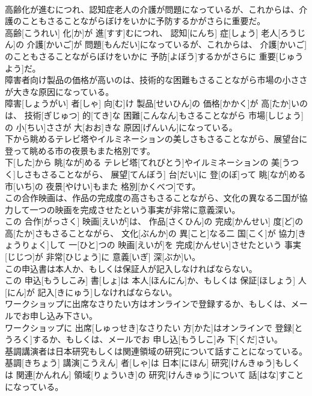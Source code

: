 \documentclass[8pt]{extreport}
\begin{document}
\begin{CJK}{UTF8}{min}
\\	高齢化が進むにつれ、認知症老人の介護が問題になっているが、これからは、介護のこともさることながらぼけをいかに予防するかがさらに重要だ。	
\\	高齢[こうれい] 化[か]が 進[すす]むにつれ、 認知[にんち] 症[しょう] 老人[ろうじん]の 介護[かいご]が 問題[もんだい]になっているが、これからは、 介護[かいご]のこともさることながらぼけをいかに 予防[よぼう]するかがさらに 重要[じゅうよう]だ。
\\	障害者向け製品の価格が高いのは、技術的な困難もさることながら市場の小ささが大きな原因になっている。	
\\	障害[しょうがい] 者[しゃ] 向[む]け 製品[せいひん]の 価格[かかく]が 高[たか]いのは、 技術[ぎじゅつ] 的[てき]な 困難[こんなん]もさることながら 市場[しじょう]の 小[ちい]ささが 大[おお]きな 原因[げんいん]になっている。
\\	下から眺めるテレビ塔やイルミネーションの美しさもさることながら、展望台に登って眺める市の夜景もまた格別です。	
\\	下[した]から 眺[なが]める テレビ塔[てれびとう]やイルミネーションの 美[うつく]しさもさることながら、 展望[てんぼう] 台[だい]に 登[のぼ]って 眺[なが]める 市[いち]の 夜景[やけい]もまた 格別[かくべつ]です。
\\	この合作映画は、作品の完成度の高さもさることながら、文化の異なる二国が協力して一つの映画を完成させたという事実が非常に意義深い。	
\\	この 合作[がっさく] 映画[えいが]は、 作品[さくひん]の 完成[かんせい] 度[ど]の 高[たか]さもさることながら、 文化[ぶんか]の 異[こと]なる二 国[こく]が 協力[きょうりょく]して 一[ひと]つの 映画[えいが]を 完成[かんせい]させたという 事実[じじつ]が 非常[ひじょう]に 意義[いぎ] 深[ぶか]い。
\\	この申込書は本人か、もしくは保証人が記入しなければならない。	
\\	この 申込[もうしこみ] 書[しょ]は 本人[ほんにん]か、もしくは 保証[ほしょう] 人[にん]が 記入[きにゅう]しなければならない。
\\	ワークショップに出席なさりたい方はオンラインで登録するか、もしくは、メールでお申し込み下さい。	
\\	ワークショップに 出席[しゅっせき]なさりたい 方[かた]はオンラインで 登録[とうろく]するか、もしくは、メールでお 申し込[もうしこ]み 下[くだ]さい。
\\	基調講演者は日本研究もしくは関連領域の研究について話すことになっている。	
\\	基調[きちょう] 講演[こうえん] 者[しゃ]は 日本[にほん] 研究[けんきゅう]もしくは 関連[かんれん] 領域[りょういき]の 研究[けんきゅう]について 話[はな]すことになっている。

\end{CJK}
\end{document}
